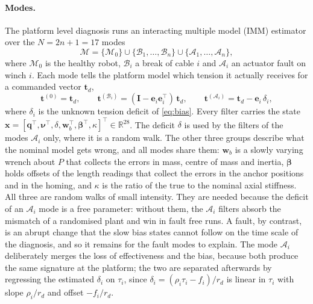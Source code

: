 \documentclass[10pt]{article}
\newcommand{\vc}[1]{\bm{#1}}
\newcommand{\mt}[1]{\mathbf{#1}}
\newcommand{\eye}{\mt{I}}
\begin{document}
\paragraph{Modes.} The platform level diagnosis runs an interacting multiple model (IMM) estimator \citep{blom1988imm} over the $N=2n+1=17$ modes
\begin{equation}
\mathcal M=\{\mathcal M_0\}\cup\{\mathcal B_1,\dots,\mathcal B_n\}\cup\{\mathcal A_1,\dots,\mathcal A_n\},
\end{equation}
where $\mathcal M_0$ is the healthy robot, $\mathcal B_i$ a break of cable $i$ and $\mathcal A_i$ an actuator fault on winch $i$. Each mode tells the platform model which tension it actually receives for a commanded vector $\vc t_d$,
\begin{equation}\label{eq:modes}
\vc t^{(0)}=\vc t_d,\qquad \vc t^{(\mathcal B_i)}=(\eye-\vc e_i\vc e_i^\top)\,\vc t_d,\qquad \vc t^{(\mathcal A_i)}=\vc t_d-\vc e_i\,\delta_i ,
\end{equation}
where $\delta_i$ is the unknown tension deficit of \eqref{eq:bias}. Every filter carries the state $\vc x=[\vc q^\top,\vc\nu^\top,\delta,\vc w_b^\top,\vc\beta^\top,\kappa]^\top\in\mathbb R^{28}$. The deficit $\delta$ is used by the filters of the modes $\mathcal A_i$ only, where it is a random walk. The other three groups describe what the nominal model gets wrong, and all modes share them: $\vc w_b$ is a slowly varying wrench about $P$ that collects the errors in mass, centre of mass and inertia, $\vc\beta$ holds offsets of the length readings that collect the errors in the anchor positions and in the homing, and $\kappa$ is the ratio of the true to the nominal axial stiffness. All three are random walks of small intensity. They are needed because the deficit of an $\mathcal A_i$ mode is a free parameter: without them, the $\mathcal A_i$ filters absorb the mismatch of a randomised plant and win in fault free runs. A fault, by contrast, is an abrupt change that the slow bias states cannot follow on the time scale of the diagnosis, and so it remains for the fault modes to explain. The mode $\mathcal A_i$ deliberately merges the loss of effectiveness and the bias, because both produce the same signature at the platform; the two are separated afterwards by regressing the estimated $\delta_i$ on $\tau_i$, since $\delta_i=(\rho_i\tau_i-f_i)/r_d$ is linear in $\tau_i$ with slope $\rho_i/r_d$ and offset $-f_i/r_d$.
\end{document}
